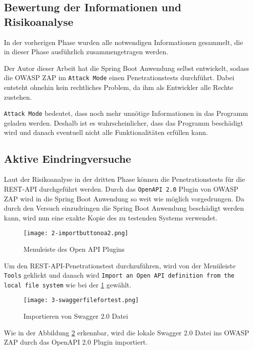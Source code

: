 \subsection{Bewertung der Informationen und Risikoanalyse}

In der vorherigen Phase wurden alle notwendigen Informationen gesammelt, die in dieser Phase ausführlich zusammengetragen werden. 

Der Autor dieser Arbeit hat die Spring Boot Anwendung selbst entwickelt, sodass die OWASP ZAP im \texttt{Attack Mode} einen  Penetrationstests durchführt. Dabei entsteht ohnehin kein rechtliches Problem, da ihm als Entwickler alle Rechte zustehen.

\texttt{Attack Mode} bedeutet, dass noch mehr unnötige Informationen in das Programm geladen werden. Deshalb ist es wahrscheinlicher, dass das Programm beschädigt wird und danach eventuell nicht alle Funktionalitäten erfüllen kann.

\subsection{Aktive Eindringversuche}

Laut der Risikoanalyse in der dritten Phase können die Penetrationstests für die REST-API durchgeführt werden. Durch das \texttt{OpenAPI 2.0} Plugin von OWASP ZAP wird in die Spring Boot Anwendung so weit wie möglich vorgedrungen. Da durch den Versuch einzudringen die Spring Boot Anwendung beschädigt werden kann, wird nun eine exakte Kopie des zu testenden Systems verwendet.\\

\newpage

\begin{figure}[h]
	\centering
	\texttt{[image: 2-importbuttonoa2.png]}
	\caption{Menuleiste des Open API Plugins}
	\label{swaggerimport1}
\end{figure}

Um den REST-API-Penetrationstest durchzuführen, wird von der Menüleiste \texttt{Tools} geklickt und danach wird \texttt{Import an Open API definition from the local file system} wie bei der \ref{swaggerimport1} gewählt.

\begin{figure}[h]
	\centering
	\texttt{[image: 3-swaggerfilefortest.png]}
	\caption{Importieren von Swagger 2.0 Datei}
	\label{swaggerimport2}
\end{figure}


Wie in der Abbildung \ref{swaggerimport2} erkennbar, wird die lokale Swagger 2.0 Datei ins OWASP ZAP durch das OpenAPI 2.0 Plugin importiert.

